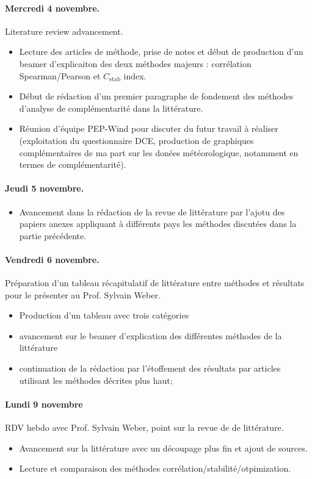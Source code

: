 \documentclass[11pt, a4paper]{article}
\begin{document}
\paragraph{Mercredi 4 novembre.} Literature review advancement.
\begin{itemize}
    \item Lecture des articles de méthode, prise de notes et début de production d'un beamer d'explicaiton des deux méthodes majeurs : corrélation Spearman/Pearson et $C_{\text{stab}}$ index.
    \item Début de rédaction d'un premier paragraphe de fondement des méthodes d'analyse de complémentarité dans la littérature.
    \item Réunion d'équipe PEP-Wind pour discuter du futur travail à réaliser (exploitation du questionnaire DCE, production de graphiques complémentaires de ma part sur les donées météorologique, notamment en termes de complémentarité).
\end{itemize}

\paragraph{Jeudi 5 novembre.}
\begin{itemize}
    \item Avancement dans la rédaction de la revue de littérature par l'ajotu des papiers anexes appliquant à différents pays les méthodes discutées dans la partie précédente. 
\end{itemize}

\paragraph{Vendredi 6 novembre.} Préparation d'un tableau récapitulatif de littérature entre méthodes et résultats pour le présenter au Prof. Sylvain Weber.
\begin{itemize}
    \item Production d'un tableau avec trois catégories
    \item avancement sur le beamer d'explication des différentes méthodes de la littérature
    \item continuation de la rédaction par l'étoffement des résultats par articles utilisant les méthodes décrites plus haut;
\end{itemize}

\paragraph{Lundi 9 novembre} RDV hebdo avec Prof. Sylvain Weber, point sur la revue de de littérature.
\begin{itemize}
    \item Avancement sur la littérature avec un découpage plus fin et ajout de sources.
    \item Lecture et comparaison des méthodes corrélation/stabilité/otpimization.
\end{itemize}
\end{document}

